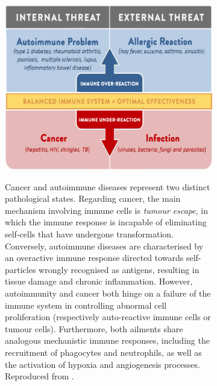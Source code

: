 \begin{figure}
     \centering
     \begin{subfigure}[p]{0.45\textwidth}
         \centering
         \includegraphics[width=\textwidth]{figures/immuno/The-Link-Between-Cancer-and-Autoimmune-Disease.jpg}
         \label{subfig:immuno-vs-cancer}
         \caption[\textbf{Autoimmune diseases and cancers: the two sides of the same coin.}]{Cancer and autoimmune diseases represent two distinct pathological states. Regarding cancer, the main mechanism involving immune cells is \textit{tumour escape}, in which the immune response is incapable of eliminating self-cells that have undergone transformation. Conversely, autoimmune diseases are characterised by an overactive immune response directed towards self-particles wrongly recognised as antigens, resulting in tissue damage and chronic inflammation. However, autoimmunity and cancer both hinge on a failure of the immune system in controlling abnormal cell proliferation (respectively auto-reactive immune cells or tumour cells). Furthermore, both ailments share analogous mechanistic immune responses, including the recruitment of phagocytes and neutrophils, as well as the activation of hypoxia and angiogenesis processes. Reproduced from \autocite[Fig .4]{sarah18}.}
     \end{subfigure}
     \hfill
     \begin{subfigure}[p]{0.45\textwidth}
         \centering

\end{subfigure}
\end{figure}
